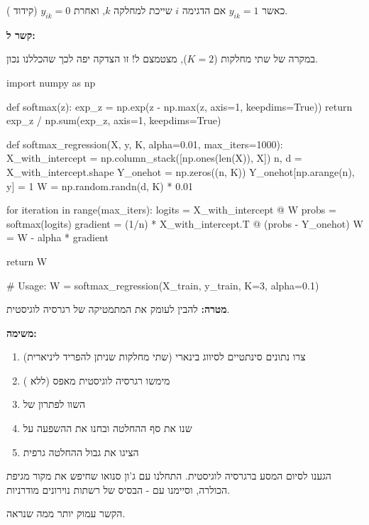 כאשר $y_{ik} = 1$ אם הדגימה $i$ שייכת למחלקה $k$, ואחרת $y_{ik} = 0$ (קידוד ).

\textbf{קשר ל:}

במקרה של שתי מחלקות ($K=2$),  מצטמצם ל! זו הצדקה יפה לכך שהכללנו נכון.

\begin{pythonbox*}
import numpy as np

def softmax(z):
    exp_z = np.exp(z - np.max(z, axis=1, keepdims=True))
    return exp_z / np.sum(exp_z, axis=1, keepdims=True)

def softmax_regression(X, y, K, alpha=0.01, max_iters=1000):
    X_with_intercept = np.column_stack([np.ones(len(X)), X])
    n, d = X_with_intercept.shape
    Y_onehot = np.zeros((n, K))
    Y_onehot[np.arange(n), y] = 1
    W = np.random.randn(d, K) * 0.01

    for iteration in range(max_iters):
        logits = X_with_intercept @ W
        probs = softmax(logits)
        gradient = (1/n) * X_with_intercept.T @ (probs - Y_onehot)
        W = W - alpha * gradient

    return W

# Usage: W = softmax_regression(X_train, y_train, K=3, alpha=0.1)
\end{pythonbox*}


\textbf{מטרה:} להבין לעומק את המתמטיקה של רגרסיה לוגיסטית.

\textbf{משימה:}

\begin{enumerate}
\item צרו נתונים סינתטיים לסיווג בינארי (שתי מחלקות שניתן להפריד ליניארית)
\item מימשו רגרסיה לוגיסטית מאפס (ללא )
\item השוו לפתרון של 
\item שנו את סף ההחלטה ובחנו את ההשפעה על 
\item הציגו את גבול ההחלטה גרפית
\end{enumerate}


הגענו לסיום המסע ברגרסיה לוגיסטית. התחלנו עם ג'ון סנואו שחיפש את מקור מגיפת הכולרה, וסיימנו עם  - הבסיס של רשתות נוירונים מודרניות.

הקשר עמוק יותר ממה שנראה.

